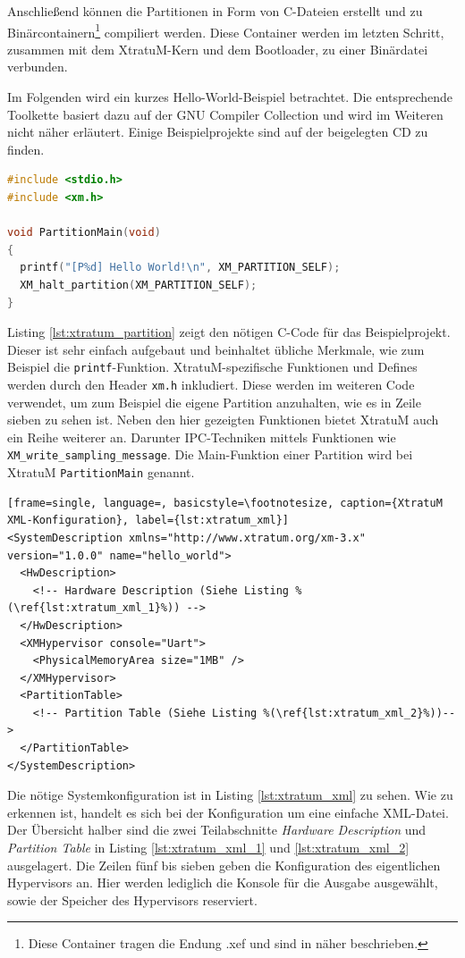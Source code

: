 \documentclass[
  a4paper,					    %
  twoside,
  DIV=calc,     				%
  bibliography=totoc,
  cleardoublepage=empty,
  ngerman,     					%
  final       					%
]{scrbook}
\begin{document}
Anschließend können die Partitionen in Form von C-Dateien erstellt und zu Binärcontainern\footnote{Diese Container tragen die Endung .xef und sind in \cite[Seite 68]{xm:usermanual} näher beschrieben.} compiliert werden. Diese Container werden im letzten Schritt, zusammen mit dem XtratuM-Kern und dem Bootloader, zu einer Binärdatei verbunden.

Im Folgenden wird ein kurzes Hello-World-Beispiel betrachtet. Die entsprechende Toolkette basiert dazu auf der GNU Compiler Collection und wird im Weiteren nicht näher erläutert. Einige Beispielprojekte sind auf der beigelegten CD zu finden.

\begin{lstlisting}[frame=single, language=C, basicstyle=\footnotesize, caption={XtratuM Beispiel Partition}, label={lst:xtratum_partition}]
#include <stdio.h>
#include <xm.h>

void PartitionMain(void)
{
  printf("[P%d] Hello World!\n", XM_PARTITION_SELF);
  XM_halt_partition(XM_PARTITION_SELF);
}
\end{lstlisting}

Listing \ref{lst:xtratum_partition} zeigt den nötigen C-Code für das Beispielprojekt. Dieser ist sehr einfach aufgebaut und beinhaltet übliche Merkmale, wie zum Beispiel die \texttt{printf}-Funktion. XtratuM-spezifische Funktionen und Defines werden durch den Header \texttt{xm.h} inkludiert. Diese werden im weiteren Code verwendet, um zum Beispiel die eigene Partition anzuhalten, wie es in Zeile sieben zu sehen ist. Neben den hier gezeigten Funktionen bietet XtratuM auch ein Reihe weiterer an. Darunter IPC-Techniken mittels Funktionen wie \texttt{XM\_write\_sampling\_message}. Die Main-Funktion einer Partition wird bei XtratuM \texttt{PartitionMain} genannt.

\begin{lstlisting}[frame=single, language=, basicstyle=\footnotesize, caption={XtratuM XML-Konfiguration}, label={lst:xtratum_xml}]
<SystemDescription xmlns="http://www.xtratum.org/xm-3.x" version="1.0.0" name="hello_world">
  <HwDescription>
    <!-- Hardware Description (Siehe Listing %(\ref{lst:xtratum_xml_1}%)) -->
  </HwDescription>
  <XMHypervisor console="Uart">
    <PhysicalMemoryArea size="1MB" />
  </XMHypervisor>
  <PartitionTable>
    <!-- Partition Table (Siehe Listing %(\ref{lst:xtratum_xml_2}%))-->
  </PartitionTable>
</SystemDescription>
\end{lstlisting}

Die nötige Systemkonfiguration ist in Listing \ref{lst:xtratum_xml} zu sehen. Wie zu erkennen ist, handelt es sich bei der Konfiguration um eine einfache XML-Datei. Der Übersicht halber sind die zwei Teilabschnitte \emph{Hardware Description} und \emph{Partition Table} in Listing \ref{lst:xtratum_xml_1} und \ref{lst:xtratum_xml_2} ausgelagert. Die Zeilen fünf bis sieben geben die Konfiguration des eigentlichen Hypervisors an. Hier werden lediglich die Konsole für die Ausgabe ausgewählt, sowie der Speicher des Hypervisors reserviert.
\end{document}
